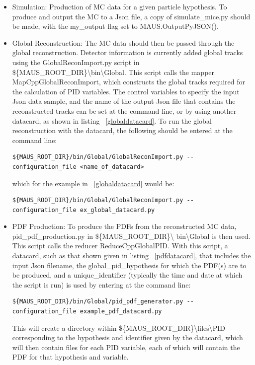 \documentclass[a4paper,12pt]{article}
\begin{document}
\begin{itemize}
\item Simulation: Production of MC data for a given particle 
hypothesis. To produce and output the MC to a Json file, a copy of 
simulate\_mice.py should be made, with the my\_output flag set to 
MAUS.OutputPyJSON().
\item Global Reconstruction: The MC data should then be passed through 
the global reconstruction. Detector information is currently added global tracks using the GlobalReconImport.py script in \\
\$\{MAUS\_ROOT\_DIR\}\textbackslash bin\textbackslash Global. This script calls the mapper 
MapCppGlobalReconImport, which constructs the global tracks required 
for the calculation of PID variables. The control variables to specify 
the input Json data sample, and the name of the output Json file that 
contains the reconstructed tracks can be set at the command line, or by 
using another datacard, as shown in listing ~\ref{globaldatacard}. To run 
the global reconstruction with the datacard, the following should be entered at the command line:

\begin{lstlisting}[breaklines=true,basicstyle=\ttfamily]
${MAUS_ROOT_DIR}/bin/Global/GlobalReconImport.py --configuration_file <name_of_datacard>
\end{lstlisting}

which for the example in ~\ref{globaldatacard} would be:

\begin{lstlisting}[breaklines=true,basicstyle=\ttfamily]
${MAUS_ROOT_DIR}/bin/Global/GlobalReconImport.py --configuration_file ex_global_datacard.py
\end{lstlisting}

\item PDF Production: To produce the PDFs from the reconstructed MC 
data, pid\_pdf\_production.py in \$\{MAUS\_ROOT\_DIR\}\textbackslash 
bin\textbackslash Global is then used. This script calls the reducer 
ReduceCppGlobalPID. With this script, a datacard, such as that shown 
given in listing ~\ref{pdfdatacard}, that includes the input Json filename, the global\_pid\_hypothesis for which the PDF(s) are to be produced, and a unique\_identifier (typically the time and date at which the script is run) is used by entering at the command line:
\begin{lstlisting}[breaklines=true,basicstyle=\ttfamily]
${MAUS_ROOT_DIR}/bin/Global/pid_pdf_generator.py --configuration_file example_pdf_datacard.py
\end{lstlisting}
This will create a directory within \$\{MAUS\_ROOT\_DIR\}\textbackslash files\textbackslash PID corresponding to the hypothesis and identifier given by the datacard, which will then contain files for each PID variable, each of which will contain the PDF for that hypothesis and variable.
\end{itemize}
\end{document}
